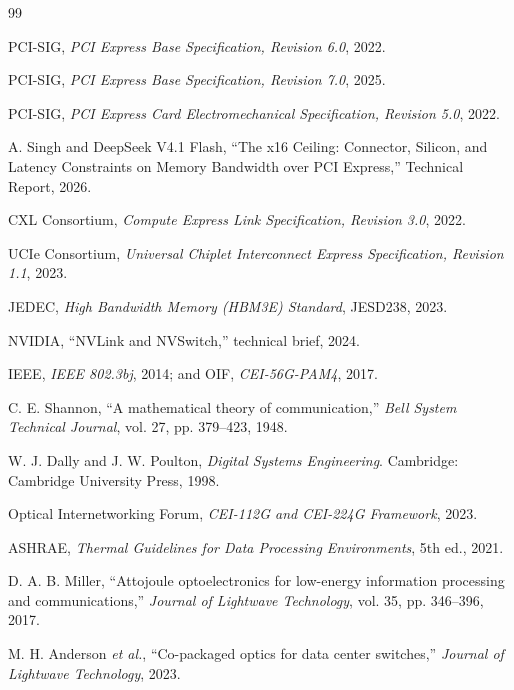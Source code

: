 \documentclass[10pt,letterpaper]{article}
\begin{document}
\begin{thebibliography}{99}

 PCI-SIG, \emph{PCI Express Base Specification, Revision 6.0}, 2022.

 PCI-SIG, \emph{PCI Express Base Specification, Revision 7.0}, 2025.

 PCI-SIG, \emph{PCI Express Card Electromechanical Specification, Revision 5.0}, 2022.

 A. Singh and DeepSeek V4.1 Flash, ``The x16 Ceiling: Connector, Silicon, and Latency Constraints on Memory Bandwidth over PCI Express,'' Technical Report, 2026.

 CXL Consortium, \emph{Compute Express Link Specification, Revision 3.0}, 2022.

 UCIe Consortium, \emph{Universal Chiplet Interconnect Express Specification, Revision 1.1}, 2023.

 JEDEC, \emph{High Bandwidth Memory (HBM3E) Standard}, JESD238, 2023.

 NVIDIA, ``NVLink and NVSwitch,'' technical brief, 2024.

 IEEE, \emph{IEEE 802.3bj}, 2014; and OIF, \emph{CEI-56G-PAM4}, 2017.

 C. E. Shannon, ``A mathematical theory of communication,'' \emph{Bell System Technical Journal}, vol. 27, pp. 379--423, 1948.

 W. J. Dally and J. W. Poulton, \emph{Digital Systems Engineering}. Cambridge: Cambridge University Press, 1998.

 Optical Internetworking Forum, \emph{CEI-112G and CEI-224G Framework}, 2023.

 ASHRAE, \emph{Thermal Guidelines for Data Processing Environments}, 5th ed., 2021.

 D. A. B. Miller, ``Attojoule optoelectronics for low-energy information processing and communications,'' \emph{Journal of Lightwave Technology}, vol. 35, pp. 346--396, 2017.

 M. H. Anderson \emph{et al.}, ``Co-packaged optics for data center switches,'' \emph{Journal of Lightwave Technology}, 2023.

\end{thebibliography}
\end{document}
